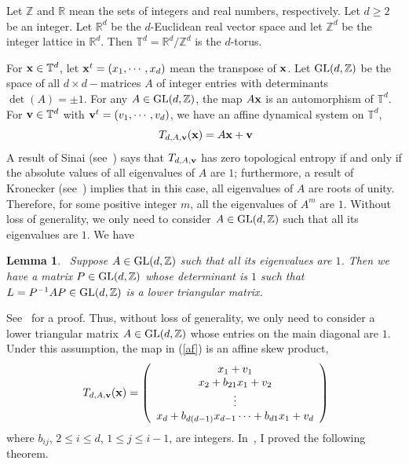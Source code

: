\documentclass[12pt,letterpaper]{amsart}
\newtheorem {lemma}{Lemma}
\newcommand {\Z} {{\mathbb Z}}
\newcommand {\R} {{\mathbb R}}
\newcommand {\Td} {{\mathbb T}^{d}}
\begin{document}
Let $\Z$ and $\R$ mean the sets of integers and real numbers, respectively. Let $d\geq 2$ be an integer. Let $\R^{d}$ be the $d$-Euclidean real vector space and let $\Z^{d}$ be the integer lattice in $\R^{d}$.  Then $\mathbb{T}^{d}=\R^{d}/\Z^{d}$ is the $d$-torus.
 
For ${\bf x}\in \Td$, let ${\bf x}^{t}=(x_{1}, \cdots, x_{d})$ mean the transpose of ${\bf x}$. Let ${\rm GL}(d, \Z)$ be the space 
of all $d\times d-$matrices $A$ of integer entries with determinants $\det(A)=\pm 1$. For any $A\in {\rm GL}(d, \Z)$, the map $A{\bf x}$ is an automorphism of $\Td$. For ${\bf v}\in \Td$ with ${\bf v}^{t} =(v_{1}, \cdots, v_{d})$, we have an affine dynamical system on ${\mathbb T}^{d}$,
\begin{equation}~\label{af}
T_{d, A, {\bf v}} ({\bf x})=A{\bf x}+{\bf v}%
\end{equation}
A result of Sinai (see~\cite{Si}) says that $T_{d, A,{\bf v}}$ has zero topological entropy if and only if the absolute values of all eigenvalues of $A$ are $1$; furthermore, a result of Kronecker (see~\cite{K}) implies that in this case, all eigenvalues of $A$ are roots of unity. Therefore, for some positive integer $m$, all the eigenvalues of $A^{m}$ are $1$. Without loss of generality, we only need to consider $A\in {\rm GL}(d,\Z)$ such that all its eigenvalues are $1$. We have 

\medskip
\begin{lemma}~\label{tm}
Suppose $A\in {\rm GL}(d,\Z)$ such that all its eigenvalues are $1$. Then we have a matrix $P\in {\rm GL}(d,\Z)$ whose determinant is $1$ such that
$L=P^{-1}AP\in {\rm GL}(d,\Z)$ is a lower triangular matrix.
\end{lemma} 

See~\cite[Lemma 1]{JPAMS} for a proof. 
Thus, without loss of generality, we only need to consider a lower triangular matrix $A\in {\rm GL}(d,\Z)$ whose entries on the main diagonal are $1$. Under this assumption, the map in (\ref{af}) is an affine skew product,
\begin{equation}~\label{asp}
T_{d, A, {\bf v}} ({\bf x})= \left(
\begin{array}{c}
x_{1}+v_{1}\\
x_{2} +b_{21}x_{1}+v_{2}\\
\vdots\\
x_{d}+b_{d(d-1)} x_{d-1} \cdots+b_{d1}x_{1} +v_{d}  
\end{array}\right)
\end{equation}
where $b_{ij}$, $2\leq i\leq d$, $1\leq j\leq i-1$, are integers.
In~\cite{JPAMS}, I proved the following theorem.
\end{document}
